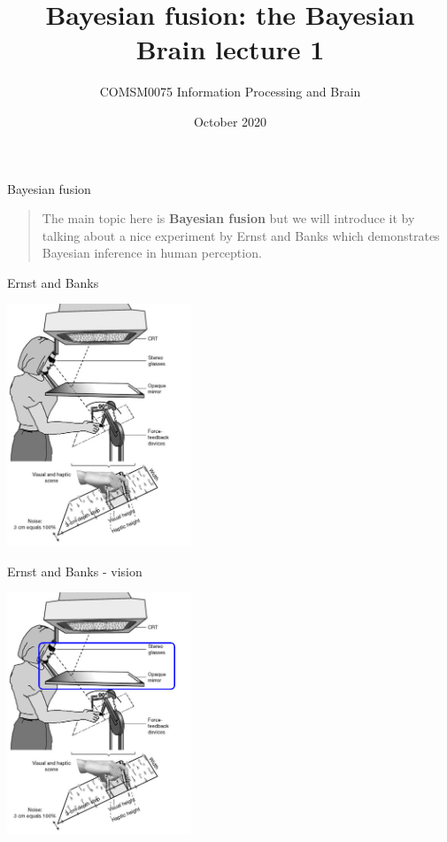 \documentclass{beamer}
\title[The Bayesian Brain lecture 2]{Bayesian fusion: the Bayesian Brain lecture 1}
\author{COMSM0075 Information Processing and Brain}
\institute{\texttt{comsm0075.github.io}}
\date{October 2020}
\begin{document}
\maketitle



\begin{frame}{Bayesian fusion}
  \begin{quote}
    The main topic here is \textbf{Bayesian fusion} but we will introduce it by talking about a nice experiment by Ernst and Banks which demonstrates Bayesian inference in human perception.
  \end{quote}
  \vfill
\end{frame}

\begin{frame}{Ernst and Banks}
\begin{center}
\includegraphics[width=5.5cm]{fig_ernstbanks.png}
\end{center}
  \vfill
\end{frame}


\begin{frame}{Ernst and Banks - vision}
\begin{center}
\includegraphics[width=5.5cm]{fig_ernstbanks_vision.png}
\end{center}
  \vfill
\end{frame}
\end{document}
